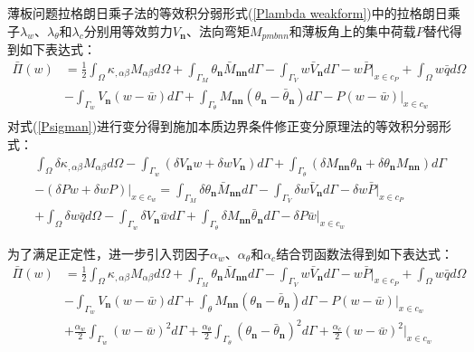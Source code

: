 薄板问题拉格朗日乘子法的等效积分弱形式(\ref{Plambda weakform})中的拉格朗日乘子$\lambda_w$、$\lambda_\theta$和$\lambda_c$分别用等效剪力$V_{\pmb n}$、法向弯矩$M_{pmb{nn}}$和薄板角上的集中荷载$P$替代得到如下表达式：
\begin{equation}\label{Psigman}
\begin{split}
    \bar{\Pi}(w)&=\frac{1}{2}\int_{\Omega}\kappa_{,\alpha\beta}M_{\alpha\beta}d\Omega+\int_{\Gamma_M}\theta_{\pmb{n}}\bar{M}_{\pmb{nn}}d\Gamma-\int_{\Gamma_V}w\bar{V}_{\pmb{n}}d\Gamma-w\bar{P}\vert_{x\in c_P}+\int_{\Omega}w\bar{q}d\Omega\\
    &-\int_{\Gamma_w}V_{\pmb{n}}(w-\bar{w})d\Gamma+\int_{\Gamma_{\theta}}M_{\pmb{nn}}(\theta_{\pmb{n}}-\bar{\theta}_{\pmb{n}})d\Gamma-P(w-\bar{w})\vert_{x\in c_w}\\
\end{split}
\end{equation}
对式(\ref{Psigman})进行变分得到施加本质边界条件修正变分原理法的等效积分弱形式：
\begin{equation}
\begin{split}
    &\int_{\Omega}\delta\kappa_{,\alpha\beta}M_{\alpha\beta}d\Omega-\int_{\Gamma_w}(\delta V_{\pmb{n}}w+\delta wV_{\pmb{n}})d\Gamma+\int_{\Gamma_{\theta}}(\delta M_{\pmb{nn}}\theta_{\pmb{n}}+\delta\theta_{\pmb{n}}M_{\pmb{nn}})d\Gamma\\
    &-(\delta Pw+\delta wP)\vert_{x\in c_w}=\int_{\Gamma_M}\delta\theta_{\pmb{n}}\bar{M}_{\pmb{nn}}d\Gamma-\int_{\Gamma_V}\delta w\bar{V}_{\pmb{n}}d\Gamma-\delta w\bar{P}\vert_{x\in c_P}\\
    &+\int_{\Omega}\delta w\bar{q}d\Omega-\int_{\Gamma_w}\delta V_{\pmb{n}}\bar{w}d\Gamma+\int_{\Gamma_{\theta}}\delta M_{\pmb{nn}}\bar{\theta}_{\pmb{n}}d\Gamma-\delta P\bar{w}\vert_{x\in c_w}
\end{split}
\end{equation}\par
为了满足正定性，进一步引入罚因子$\alpha_w$、$\alpha_\theta$和$\alpha_c$结合罚函数法得到如下表达式：
\begin{equation}\label{Pnitsche}
\begin{split}
    \bar{\Pi}(w)&=\frac{1}{2}\int_{\Omega}\kappa_{,\alpha\beta}M_{\alpha\beta}d\Omega+\int_{\Gamma_M}\theta_{\pmb{n}}\bar{M}_{\pmb{nn}}d\Gamma-\int_{\Gamma_V}w\bar{V}_{\pmb{n}}d\Gamma-w\bar{P}\vert_{x\in c_P}+\int_{\Omega}w\bar{q}d\Omega\\
&-\int_{\Gamma_w}V_{\pmb{n}}(w-\bar{w})d\Gamma+\int_{\theta}M_{\pmb{nn}}(\theta_{\pmb{n}}-\bar{\theta}_{\pmb{n}})d\Gamma-P(w-\bar{w})\vert_{x\in c_w}\\
&+\frac{\alpha_w}{2}\int_{\Gamma_w}(w-\bar{w})^2d\Gamma+\frac{\alpha_{\theta}}{2}\int_{\Gamma_{\theta}}(\theta_{\pmb{n}}-\bar{\theta}_{\pmb{n}})^2d\Gamma+\frac{\alpha_c}{2}(w-\bar{w})^2\vert_{x\in c_w}
\end{split}
\end{equation}
